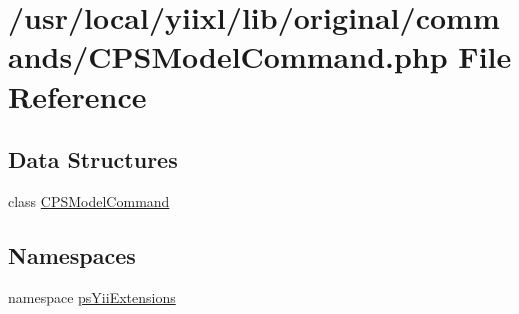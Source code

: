 \hypertarget{CPSModelCommand_8php}{
\section{/usr/local/yiixl/lib/original/commands/CPSModelCommand.php File Reference}
\label{CPSModelCommand_8php}
}
\subsection*{Data Structures}
\begin{DoxyCompactItemize}
\item 
class \hyperlink{classCPSModelCommand}{CPSModelCommand}
\end{DoxyCompactItemize}
\subsection*{Namespaces}
\begin{DoxyCompactItemize}
\item 
namespace \hyperlink{namespacepsYiiExtensions}{psYiiExtensions}
\end{DoxyCompactItemize}
